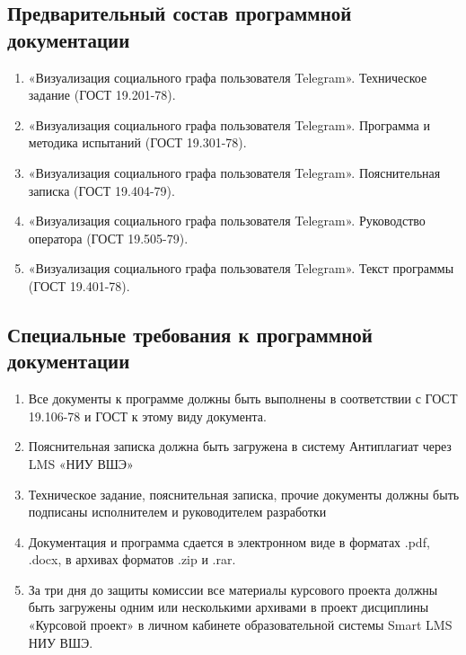\subsection{Предварительный состав программной документации}

\begin{enumerate}
    \item «Визуализация социального графа пользователя Telegram». Техническое задание (ГОСТ 19.201-78)\cite{gostTZ}.
    \item «Визуализация социального графа пользователя Telegram». Программа и методика испытаний (ГОСТ 19.301-78)\cite{gostPMI}.
    \item «Визуализация социального графа пользователя Telegram». Пояснительная записка (ГОСТ 19.404-79)\cite{gostPZ}.
    \item «Визуализация социального графа пользователя Telegram». Руководство оператора (ГОСТ 19.505-79)\cite{gostRO}.
    \item «Визуализация социального графа пользователя Telegram». Текст программы (ГОСТ 19.401-78)\cite{gostTP}.
\end{enumerate}

\subsection{Специальные требования к программной документации}

\begin{enumerate}
    \item Все документы к программе должны быть выполнены в соответствии с ГОСТ 19.106-78\cite{gostDoc} и ГОСТ к этому виду документа. 
    \item Пояснительная записка должна быть загружена в систему Антиплагиат через LMS «НИУ ВШЭ»
    \item Техническое задание, пояснительная записка, прочие документы должны быть подписаны исполнителем и руководителем разработки
    \item Документация и программа сдается в электронном виде в форматах .pdf, .docx, в архивах форматов .zip и .rar.
    \item За три дня до защиты комиссии все материалы курсового проекта должны быть загружены одним или несколькими архивами в проект дисциплины «Курсовой проект» в личном кабинете образовательной системы Smart LMS НИУ ВШЭ.
\end{enumerate}